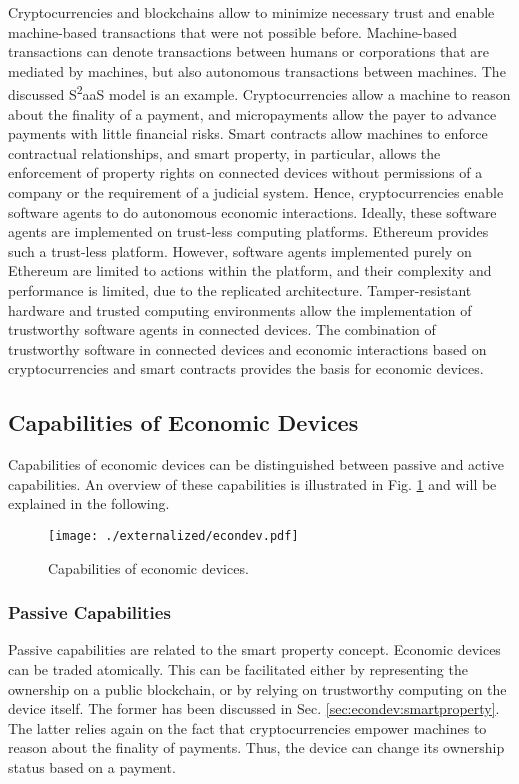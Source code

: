 Cryptocurrencies and blockchains allow to minimize necessary trust and enable machine-based transactions that were not possible before. 
Machine-based transactions can denote transactions between humans or corporations that are mediated by machines, but also autonomous transactions between machines. The discussed S\textsuperscript{2}aaS model is an example. Cryptocurrencies allow a machine to reason about the finality of a payment, and micropayments allow the payer to advance payments with little financial risks. Smart contracts allow machines to enforce contractual relationships, and smart property, in particular, allows the enforcement of property rights on connected devices without permissions of a company or the requirement of a judicial system. 
Hence, cryptocurrencies enable software agents to do autonomous economic interactions. Ideally, these software agents are implemented on trust-less computing platforms. Ethereum provides such a trust-less platform. However, software agents implemented purely on Ethereum are limited to actions within the platform, and their complexity and performance is limited, due to the replicated architecture. Tamper-resistant hardware and trusted computing environments allow the implementation of trustworthy software agents in connected devices. The combination of trustworthy software in connected devices and economic interactions based on cryptocurrencies and smart contracts provides the basis for economic devices.

\subsection{Capabilities of Economic Devices}

Capabilities of economic devices can be distinguished between passive and active capabilities. An overview of these capabilities is illustrated in Fig. \ref{fig:econdev} and will be explained in the following.

\begin{figure}
\centering
\texttt{[image: ./externalized/econdev.pdf]}
\caption{Capabilities of economic devices.}
\label{fig:econdev}
\end{figure}

\subsubsection{Passive Capabilities}

Passive capabilities are related to the smart property concept.
Economic devices can be traded atomically. This can be facilitated either by representing the ownership on a public blockchain, or by relying on trustworthy computing on the device itself. The former has been discussed in Sec. \ref{sec:econdev:smartproperty}. The latter relies again on the fact that cryptocurrencies empower machines to reason about the finality of payments. Thus, the device can change its ownership status based on a payment. 

